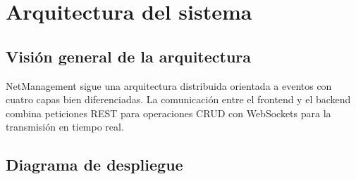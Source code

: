 \documentclass[12pt, a4paper, twoside]{article}
\begin{document}
\section{Arquitectura del sistema}

\subsection{Visión general de la arquitectura}

NetManagement sigue una arquitectura distribuida orientada a eventos con cuatro capas bien diferenciadas. La comunicación entre el frontend y el backend combina peticiones REST para operaciones CRUD con WebSockets para la transmisión en tiempo real.

\subsection{Diagrama de despliegue}
\end{document}
